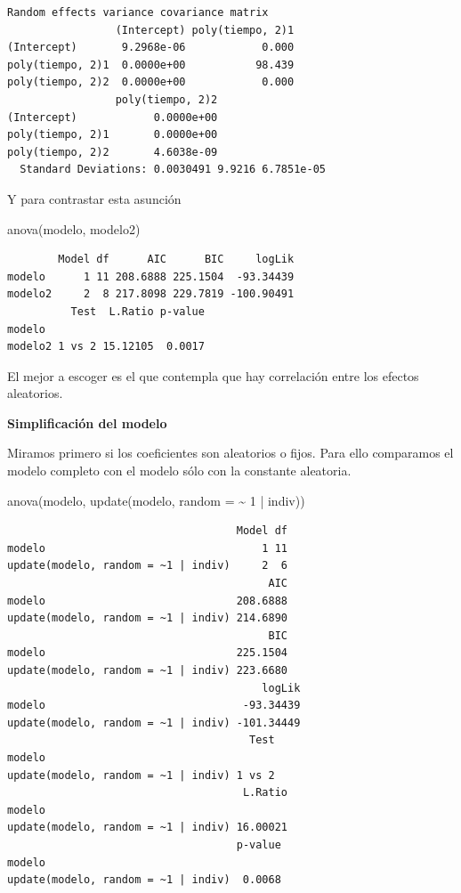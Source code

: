 \documentclass[
]{book}
\newenvironment{Shaded}{\begin{snugshade}}{\end{snugshade}}
\newcommand{\AttributeTok}[1]{\textcolor[rgb]{0.77,0.63,0.00}{#1}}
\newcommand{\DecValTok}[1]{\textcolor[rgb]{0.00,0.00,0.81}{#1}}
\newcommand{\FunctionTok}[1]{\textcolor[rgb]{0.00,0.00,0.00}{#1}}
\newcommand{\NormalTok}[1]{#1}
\newcommand{\SpecialCharTok}[1]{\textcolor[rgb]{0.00,0.00,0.00}{#1}}
\begin{document}
\begin{verbatim}
Random effects variance covariance matrix
                 (Intercept) poly(tiempo, 2)1
(Intercept)       9.2968e-06            0.000
poly(tiempo, 2)1  0.0000e+00           98.439
poly(tiempo, 2)2  0.0000e+00            0.000
                 poly(tiempo, 2)2
(Intercept)            0.0000e+00
poly(tiempo, 2)1       0.0000e+00
poly(tiempo, 2)2       4.6038e-09
  Standard Deviations: 0.0030491 9.9216 6.7851e-05 
\end{verbatim}

Y para contrastar esta asunción

\begin{Shaded}
\begin{Highlighting}[]
\FunctionTok{anova}\NormalTok{(modelo, modelo2)}
\end{Highlighting}
\end{Shaded}

\begin{verbatim}
        Model df      AIC      BIC     logLik
modelo      1 11 208.6888 225.1504  -93.34439
modelo2     2  8 217.8098 229.7819 -100.90491
          Test  L.Ratio p-value
modelo                         
modelo2 1 vs 2 15.12105  0.0017
\end{verbatim}

El mejor a escoger es el que contempla que hay correlación entre los efectos aleatorios.

\textbf{Simplificación del modelo}

Miramos primero si los coeficientes son aleatorios o fijos. Para ello comparamos el modelo completo con el modelo sólo con la constante aleatoria.

\begin{Shaded}
\begin{Highlighting}[]
\FunctionTok{anova}\NormalTok{(modelo, }\FunctionTok{update}\NormalTok{(modelo, }\AttributeTok{random =} \SpecialCharTok{\textasciitilde{}} \DecValTok{1} \SpecialCharTok{|}\NormalTok{ indiv))}
\end{Highlighting}
\end{Shaded}

\begin{verbatim}
                                    Model df
modelo                                  1 11
update(modelo, random = ~1 | indiv)     2  6
                                         AIC
modelo                              208.6888
update(modelo, random = ~1 | indiv) 214.6890
                                         BIC
modelo                              225.1504
update(modelo, random = ~1 | indiv) 223.6680
                                        logLik
modelo                               -93.34439
update(modelo, random = ~1 | indiv) -101.34449
                                      Test
modelo                                    
update(modelo, random = ~1 | indiv) 1 vs 2
                                     L.Ratio
modelo                                      
update(modelo, random = ~1 | indiv) 16.00021
                                    p-value
modelo                                     
update(modelo, random = ~1 | indiv)  0.0068
\end{verbatim}
\end{document}
